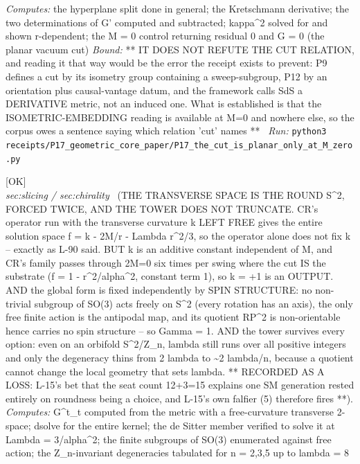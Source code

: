 \begin{description}
\emph{Computes:} the hyperplane split done in general; the Kretschmann derivative; the two determinations of G' computed and subtracted; kappa\textasciicircum{}2 solved for and shown r-dependent; the M = 0 control returning residual 0 and G = 0 (the planar vacuum cut)
 \emph{Bound:} ** IT DOES NOT REFUTE THE CUT RELATION, and reading it that way would be the error the receipt exists to prevent: P9 defines a cut by its isometry group containing a sweep-subgroup, P12 by an orientation plus causal-vantage datum, and the framework calls SdS a DERIVATIVE metric, not an induced one. What is established is that the ISOMETRIC-EMBEDDING reading is available at M=0 and nowhere else, so the corpus owes a sentence saying which relation 'cut' names **
\ \emph{Run:} \texttt{python3 receipts/P17\_geometric\_core\_paper/P17\_the\_cut\_is\_planar\_only\_at\_M\_zero.py}
\item[\label{rcpt:P03_transverse_space_is_round}\texttt{P03\_transverse\_space\_is\_round}]\hfill\textsf{[OK]}\\
\textit{sec:slicing / sec:chirality} \ (THE TRANSVERSE SPACE IS THE ROUND S\textasciicircum{}2, FORCED TWICE, AND THE TOWER DOES NOT TRUNCATE. CR's operator run with the transverse curvature k LEFT FREE gives the entire solution space f = k - 2M/r - Lambda r\textasciicircum{}2/3, so the operator alone does not fix k -- exactly as L-90 said. BUT k is an additive constant independent of M, and CR's family passes through 2M=0 six times per swing where the cut IS the substrate (f = 1 - r\textasciicircum{}2/alpha\textasciicircum{}2, constant term 1), so k = +1 is an OUTPUT. AND the global form is fixed independently by SPIN STRUCTURE: no non-trivial subgroup of SO(3) acts freely on S\textasciicircum{}2 (every rotation has an axis), the only free finite action is the antipodal map, and its quotient RP\textasciicircum{}2 is non-orientable hence carries no spin structure -- so Gamma = 1. AND the tower survives every option: even on an orbifold S\textasciicircum{}2/Z\_n, lambda still runs over all positive integers and only the degeneracy thins from 2 lambda to \textasciitilde{}2 lambda/n, because a quotient cannot change the local geometry that sets lambda. ** RECORDED AS A LOSS: L-15's bet that the seat count 12+3=15 explains one SM generation rested entirely on roundness being a choice, and L-15's own falfier (5) therefore fires **). 
\emph{Computes:} G\textasciicircum{}t\_t computed from the metric with a free-curvature transverse 2-space; dsolve for the entire kernel; the de Sitter member verified to solve it at Lambda = 3/alpha\textasciicircum{}2; the finite subgroups of SO(3) enumerated against free action; the Z\_n-invariant degeneracies tabulated for n = 2,3,5 up to lambda = 8

\end{description}
